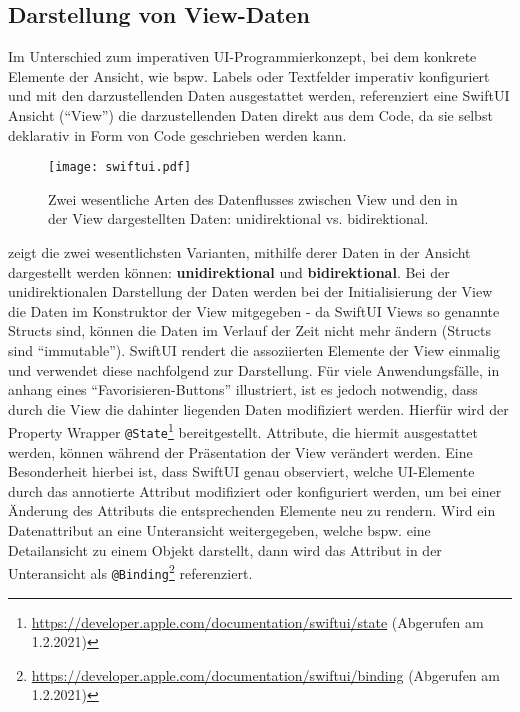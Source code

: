 \subsection{Darstellung von View-Daten}

Im Unterschied zum imperativen UI-Programmierkonzept, bei dem konkrete Elemente der Ansicht, wie bspw. Labels oder Textfelder imperativ konfiguriert und mit den darzustellenden Daten ausgestattet werden, referenziert eine SwiftUI Ansicht (\enquote{View}) die darzustellenden Daten direkt aus dem Code, da sie selbst deklarativ in Form von Code geschrieben werden kann.

\begin{figure}[H]
\texttt{[image: swiftui.pdf]}
\caption{Zwei wesentliche Arten des Datenflusses zwischen View und den in der View dargestellten Daten: unidirektional vs. bidirektional.}\label{fig:swiftui}
\end{figure}

\noindent {} zeigt die zwei wesentlichsten Varianten, mithilfe derer Daten in der Ansicht dargestellt werden können: \textbf{unidirektional} und \textbf{bidirektional}. Bei der unidirektionalen Darstellung der Daten werden bei der Initialisierung der View die Daten im Konstruktor der View mitgegeben - da SwiftUI Views so genannte Structs sind, können die Daten im Verlauf der Zeit nicht mehr ändern (Structs sind \enquote{immutable}). SwiftUI rendert die assoziierten Elemente der View einmalig und verwendet diese nachfolgend zur Darstellung. Für viele Anwendungsfälle, in  anhang eines \enquote{Favorisieren-Buttons} illustriert, ist es jedoch notwendig, dass durch die View die dahinter liegenden Daten modifiziert werden. Hierfür wird der Property Wrapper \texttt{@State}\footnote{\url{https://developer.apple.com/documentation/swiftui/state} (Abgerufen am 1.2.2021)} bereitgestellt. Attribute, die hiermit ausgestattet werden, können während der Präsentation der View verändert werden. Eine Besonderheit hierbei ist, dass SwiftUI genau observiert, welche UI-Elemente durch das annotierte Attribut modifiziert oder konfiguriert werden, um bei einer Änderung des Attributs die entsprechenden Elemente neu zu rendern. Wird ein Datenattribut an eine Unteransicht weitergegeben, welche bspw. eine Detailansicht zu einem Objekt darstellt, dann wird das Attribut in der Unteransicht als \texttt{@Binding}\footnote{\url{https://developer.apple.com/documentation/swiftui/binding} (Abgerufen am 1.2.2021)} referenziert.

